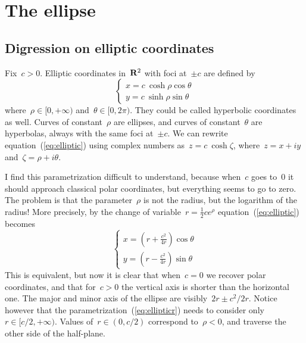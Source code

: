 \section{The ellipse}


\subsection{Digression on elliptic coordinates}

Fix~$c>0$.  Elliptic coordinates in~$\mathbf{R}^2$ with foci at~$\pm c$ are
defined by
\begin{equation}\label{eq:elliptic}
	\begin{cases}
		x = c\ \cosh\rho\cos\theta \\
		y = c\ \sinh\rho\sin\theta
	\end{cases}
\end{equation}
where~$\rho\in[0,+\infty)$ and~$\theta\in[0,2\pi)$.
They could be called hyperbolic coordinates as well.
Curves of constant~$\rho$ are ellipses, and curves of
constant~$\theta$ are hyperbolas, always with the same foci at~$\pm
c$.  We can rewrite equation~(\ref{eq:elliptic}) using complex
numbers as~$z=c\ \cosh\zeta$,  where~$z=x+iy$ and~$\zeta=\rho+i\theta$.

I find this parametrization difficult to understand,
because when~$c$ goes to~$0$ it should approach classical polar
coordinates, but everything seems to go to zero.
The problem is that the parameter~$\rho$ is not the radius, but the
logarithm of the radius!  More precisely, by the change of
variable~$r=\frac12ce^\rho$ equation~(\ref{eq:elliptic}) becomes
\begin{equation}\label{eq:ellipticr}
	\begin{cases}
		x = \left(r + \frac{c^2}{4r}\right)\cos\theta \\
		y = \left(r - \frac{c^2}{4r}\right)\sin\theta
	\end{cases}
\end{equation}
This is equivalent, but now it is clear that when~$c=0$ we recover
polar coordinates, and that for~$c>0$ the vertical axis is shorter
than the horizontal one.  The major and minor axis of the ellipse are
visibly~$2r\pm c^2/2r$.
Notice however that the
parametrization~(\ref{eq:ellipticr}) needs to consider
only~$r\in[c/2,+\infty)$.  Values of~$r\in(0,c/2)$ correspond
to~$\rho<0$, and traverse the other side of the half-plane.



